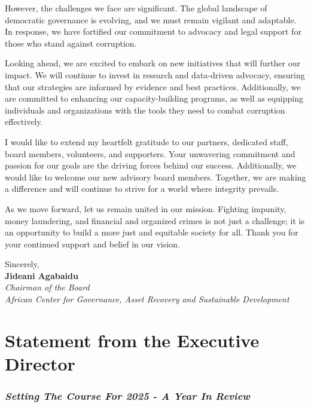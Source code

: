 \documentclass[
  letterpaper,
  DIV=11,
  numbers=noendperiod]{scrreprt}
\begin{document}
However, the challenges we face are significant. The global landscape of
democratic governance is evolving, and we must remain vigilant and
adaptable. In response, we have fortified our commitment to advocacy and
legal support for those who stand against corruption.

Looking ahead, we are excited to embark on new initiatives that will
further our impact. We will continue to invest in research and
data-driven advocacy, ensuring that our strategies are informed by
evidence and best practices. Additionally, we are committed to enhancing
our capacity-building programs, as well as equipping individuals and
organizations with the tools they need to combat corruption effectively.

I would like to extend my heartfelt gratitude to our partners, dedicated
staff, board members, volunteers, and supporters. Your unwavering
commitment and passion for our goals are the driving forces behind our
success. Additionally, we would like to welcome our new advisory board
members. Together, we are making a difference and will continue to
strive for a world where integrity prevails.

As we move forward, let us remain united in our mission. Fighting
impunity, money laundering, and financial and organized crimes is not
just a challenge; it is an opportunity to build a more just and
equitable society for all. Thank you for your continued support and
belief in our vision.

Sincerely,\\

\textbf{Jideani Agabaidu}\\
\emph{Chairman of the Board}\\
\emph{African Center for Governance, Asset Recovery and Sustainable
Development}\\

\chapter*{Statement from the Executive
Director}\label{statement-from-the-executive-director}


\subsection*{\texorpdfstring{\emph{Setting The Course For 2025 - A Year
In
Review}}{Setting The Course For 2025 - A Year In Review}}\label{setting-the-course-for-2025---a-year-in-review}
\end{document}
